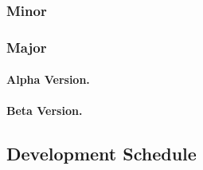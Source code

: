 \documentclass[12pt]{article}
\begin{document}
\subsubsection{Minor}

\subsubsection{Major}

\paragraph{Alpha Version.}

\paragraph{Beta Version.}

\subsection{Development Schedule}
\end{document}
